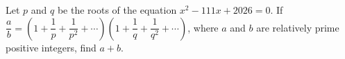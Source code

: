 Let $p$ and $q$ be the roots of the equation $x^2-111x+2026=0$. If $\dfrac{a}{b}=\left(1+\dfrac{1}{p}+\dfrac{1}{p^2}+\cdots\right)\left(1+\dfrac{1}{q}+\dfrac{1}{q^2}+\cdots\right)$, where $a$ and $b$ are relatively prime positive integers, find $a+b$.
